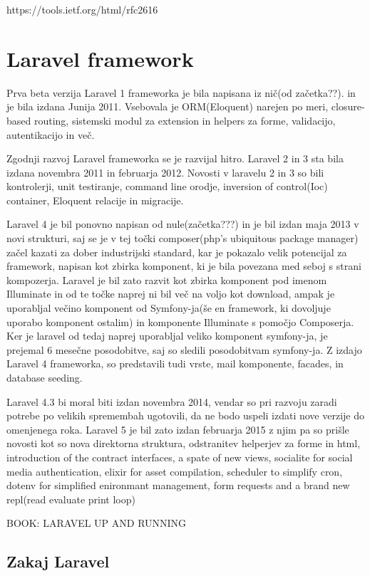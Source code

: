 \documentclass[12pt,a4paper,titlepage,openany]{report}
\begin{document}
https://tools.ietf.org/html/rfc2616


\section{Laravel framework}
Prva beta verzija Laravel 1 frameworka je bila napisana iz nič(od začetka??). in je bila izdana Junija 2011. Vsebovala je ORM(Eloquent) narejen po meri, closure-based routing, sistemski modul za extension in helpers za forme, validacijo, autentikacijo in več.

Zgodnji razvoj Laravel frameworka se je razvijal hitro. Laravel 2 in 3 sta bila izdana novembra 2011 in februarja 2012. Novosti v laravelu 2 in 3 so bili kontrolerji, unit testiranje, command line orodje, inversion of control(Ioc) container, Eloquent relacije in migracije.

Laravel 4 je bil ponovno napisan od nule(začetka???) in je bil izdan maja 2013 v novi strukturi, saj se je v tej točki composer(php's ubiquitous package manager) začel kazati za dober industrijski standard, kar je pokazalo velik potencijal za framework, napisan kot zbirka komponent, ki je bila povezana med seboj s strani kompozerja. Laravel je bil zato razvit kot zbirka komponent pod imenom Illuminate in od te točke naprej ni bil več na voljo kot download, ampak je uporabljal večino komponent od Symfony-ja(še en framework, ki dovoljuje uporabo komponent ostalim) in komponente Illuminate s pomočjo Composerja. Ker je laravel od tedaj naprej uporabljal veliko komponent symfony-ja, je prejemal 6 mesečne posodobitve, saj so sledili posodobitvam symfony-ja. Z izdajo Laravel 4 frameworka, so predstavili tudi vrste, mail komponente, facades, in database seeding.

Laravel 4.3 bi moral biti izdan novembra 2014, vendar so pri razvoju zaradi potrebe po velikih spremembah ugotovili, da ne bodo uspeli izdati nove verzije do omenjenega roka. Laravel 5 je bil zato izdan februarja 2015 z njim pa so prišle novosti kot so nova direktorna struktura, odstranitev helperjev za forme in html, introduction of the contract interfaces, a spate of new views, socialite for social media authentication, elixir for asset compilation, scheduler to simplify cron, dotenv for simplified enironmant management, form requests and a brand new repl(read evaluate print loop)


BOOK: LARAVEL UP AND RUNNING

\subsection{Zakaj Laravel}
\end{document}

